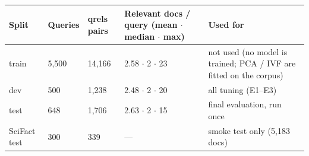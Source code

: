 \begin{tabular}{lllll}
\hline
Split & Queries & qrels pairs & Relevant docs / query (mean $\cdot$ median $\cdot$ max) & Used for \\
\hline
train & 5,500 & 14,166 & 2.58 $\cdot$ 2 $\cdot$ 23 & not used (no model is trained; PCA / IVF are fitted on the corpus) \\
dev & 500 & 1,238 & 2.48 $\cdot$ 2 $\cdot$ 20 & all tuning (E1--E3) \\
test & 648 & 1,706 & 2.63 $\cdot$ 2 $\cdot$ 15 & final evaluation, run once \\
SciFact test & 300 & 339 & --- & smoke test only (5,183 docs) \\
\hline
\end{tabular}
